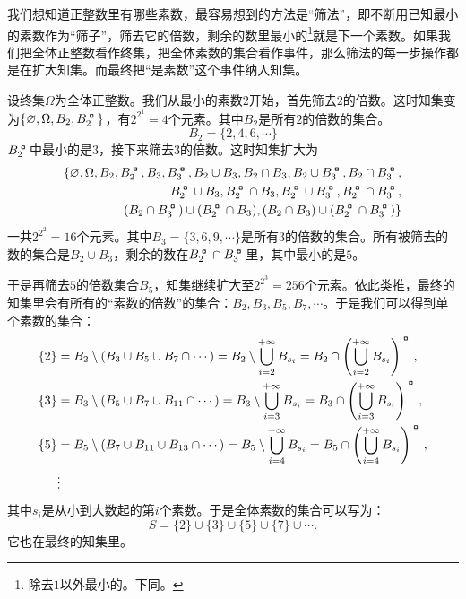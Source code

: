 \documentclass[12pt,UTF8]{ctexbook}
\begin{document}
\begin{ex}
    我们想知道正整数里有哪些素数，最容易想到的方法是“筛法”，即不断用已知最小的素数作为“筛子”，筛去它的倍数，剩余的数里最小的\footnote{除去$1$以外最小的。下同。}就是下一个素数。如果我们把全体正整数看作终集，把全体素数的集合看作事件，那么筛法的每一步操作都是在扩大知集。而最终把“是素数”这个事件纳入知集。

    设终集$\Omega$为全体正整数。我们从最小的素数$2$开始，首先筛去$2$的倍数。这时知集变为$\{\varnothing, \Omega, B_2, B_2^{\bu}\}$，有$2^{2^1} = 4$个元素。其中$B_2$是所有$2$的倍数的集合。
    $$B_2 = \{2,4,6,\cdots\}$$
    $B_2^{\bu}$中最小的是$3$，接下来筛去$3$的倍数。这时知集扩大为
    \begin{align*}
        \{\varnothing, \Omega, B_2, B_2^{\bu}, B_3, B_3^{\bu}, B_2\cup B_3, B_2\cap B_3, B_2\cup B_3^{\bu}, B_2\cap B_3^{\bu},\\
        B_2^{\bu}\cup B_3, B_2^{\bu}\cap B_3, B_2^{\bu}\cup B_3^{\bu}, B_2^{\bu}\cap B_3^{\bu}, \\ (B_2\cap B_3^{\bu})\cup(B_2^{\bu}\cap B_3), (B_2\cap B_3)\cup(B_2^{\bu}\cap B_3^{\bu})\}
    \end{align*}
    一共$2^{2^2} = 16$个元素。其中$B_3= \{3,6,9,\cdots\}$是所有$3$的倍数的集合。所有被筛去的数的集合是$B_2\cup B_3$，剩余的数在$B_2^{\bu}\cap B_3^{\bu}$里，其中最小的是$5$。
    
    于是再筛去$5$的倍数集合$B_5$，知集继续扩大至$2^{2^3} = 256$个元素。依此类推，最终的知集里会有所有的“素数的倍数”的集合：$B_2, B_3, B_5, B_7, \cdots$。于是我们可以得到单个素数的集合：
    \begin{align*}
        \{2\} &= B_2 \setminus \left(B_3 \cup B_5 \cup B_7\cap\cdots\right) = B_2 \setminus \bigcup_{i=2}^{+\infty} B_{s_i} = B_2 \cap \left(\bigcup_{i=2}^{+\infty} B_{s_i} \right)^{\bu}, \\
        \{3\} &= B_3 \setminus \left(B_5 \cup B_7 \cup B_{11}\cap\cdots\right) = B_3 \setminus \bigcup_{i=3}^{+\infty} B_{s_i} = B_3 \cap \left(\bigcup_{i=3}^{+\infty} B_{s_i} \right)^{\bu}, \\
        \{5\} &= B_5 \setminus \left(B_7 \cup B_{11} \cup B_{13}\cap\cdots\right) = B_5 \setminus \bigcup_{i=4}^{+\infty} B_{s_i} = B_5 \cap \left(\bigcup_{i=4}^{+\infty} B_{s_i} \right)^{\bu}, \\
        &\vdots
    \end{align*}
    其中$s_i$是从小到大数起的第$i$个素数。于是全体素数的集合可以写为：
    $$ S = \{2\}\cup \{3\} \cup \{5\}\cup \{7\}\cup\cdots .$$
    它也在最终的知集里。
\end{ex}
\end{document}
